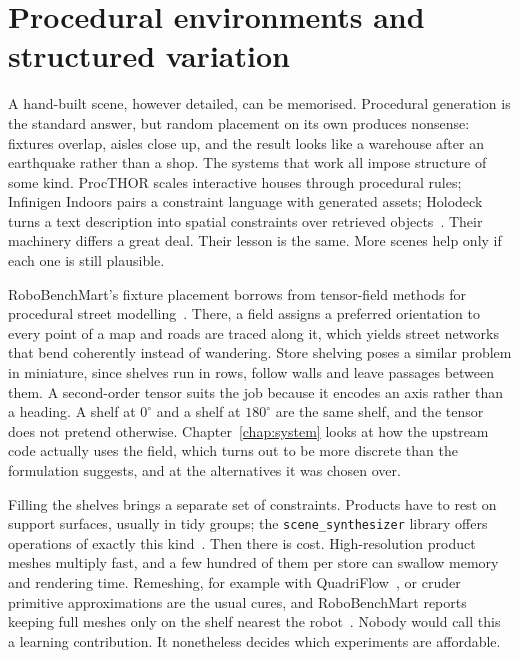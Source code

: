 \section{Procedural environments and structured variation}

A hand-built scene, however detailed, can be memorised. Procedural generation is the standard answer, but random placement on its own produces nonsense: fixtures overlap, aisles close up, and the result looks like a warehouse after an earthquake rather than a shop. The systems that work all impose structure of some kind. ProcTHOR scales interactive houses through procedural rules; Infinigen Indoors pairs a constraint language with generated assets; Holodeck turns a text description into spatial constraints over retrieved objects~\cite{deitke2022procthor,raistrick2024infinigenindoors,yang2024holodeck}. Their machinery differs a great deal. Their lesson is the same. More scenes help only if each one is still plausible.

RoboBenchMart's fixture placement borrows from tensor-field methods for procedural street modelling~\cite{chen2008interactive}. There, a field assigns a preferred orientation to every point of a map and roads are traced along it, which yields street networks that bend coherently instead of wandering. Store shelving poses a similar problem in miniature, since shelves run in rows, follow walls and leave passages between them. A second-order tensor suits the job because it encodes an axis rather than a heading. A shelf at $0^{\circ}$ and a shelf at $180^{\circ}$ are the same shelf, and the tensor does not pretend otherwise. Chapter~\ref{chap:system} looks at how the upstream code actually uses the field, which turns out to be more discrete than the formulation suggests, and at the alternatives it was chosen over.

Filling the shelves brings a separate set of constraints. Products have to rest on support surfaces, usually in tidy groups; the \texttt{scene\_synthesizer} library offers operations of exactly this kind~\cite{eppner2025scene}. Then there is cost. High-resolution product meshes multiply fast, and a few hundred of them per store can swallow memory and rendering time. Remeshing, for example with QuadriFlow~\cite{huang2018quadriflow}, or cruder primitive approximations are the usual cures, and RoboBenchMart reports keeping full meshes only on the shelf nearest the robot~\cite{soshin2025robobenchmart}. Nobody would call this a learning contribution. It nonetheless decides which experiments are affordable.

